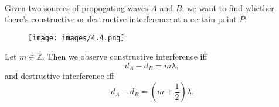 \documentclass{article}
\begin{document}
\

Given two sources of propogating waves $A$ and $B$, we want to find whether there's constructive or destructive interference at a certain point $P$:

\begin{figure}[htp]
    \centering
    \texttt{[image: images/4.4.png]}
\end{figure}

Let $m\in \mathbb{Z}$. Then we observe constructive interference iff
\begin{equation}
d_{A} -d_{B} =m\lambda ,
\end{equation}
and destructive interference iff
\begin{equation}
d_{A} -d_{B} =\left( m+\frac{1}{2}\right) \lambda .
\end{equation}



\end{document}
